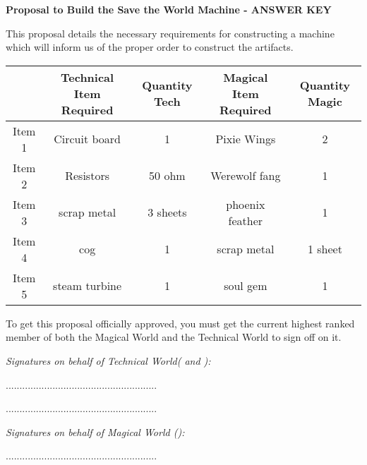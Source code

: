 \documentclass[white]{guildcamp3}
\begin{document}
\name{\wProposalAns{}} %
\large\textbf{Proposal to Build the Save the World Machine - ANSWER KEY}  


This proposal details the necessary requirements for constructing a machine which will inform us of the proper order to construct the artifacts. 


\begin{tabular}{|c|c|c|c|c|}
	\hline \rule[-2ex]{0pt}{5.5ex}  & Technical Item Required & Quantity Tech & Magical Item Required & Quantity Magic \\ 
	\hline \rule[-2ex]{0pt}{5.5ex} Item 1 & Circuit board & 1 & Pixie Wings & 2 \\ 
	\hline \rule[-2ex]{0pt}{5.5ex} Item 2 & Resistors & 50 ohm & Werewolf fang & 1 \\ 
	\hline \rule[-2ex]{0pt}{5.5ex} Item 3 & scrap metal & 3 sheets & phoenix feather & 1 \\ 
	\hline \rule[-2ex]{0pt}{5.5ex} Item 4 & cog & 1 & scrap metal & 1 sheet \\ 
	\hline \rule[-2ex]{0pt}{5.5ex} Item 5 & steam turbine & 1 & soul gem & 1 \\ 
	\hline 
\end{tabular} 

To get this proposal officially approved, you must get the current highest ranked member of both the Magical World and the Technical World to sign off on it. 



\emph{Signatures on behalf of Technical World(\cPoliOne{\intro} and \cPoliTwo{\intro}): }

.......................................................

.......................................................

\emph{Signatures on behalf of Magical World (\cNobleOne{\intro}):}


.......................................................


\end{document}
